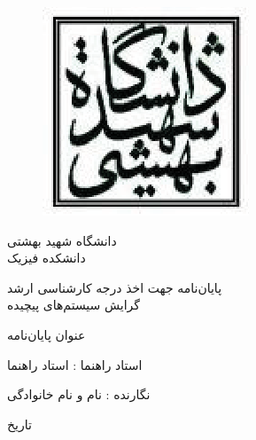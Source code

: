  \newpage
\thispagestyle{empty}
\begin{figure}[h]
\begin{center}
\includegraphics[scale = 1.5]{Logo.eps}
\end{center}
\end{figure}
\begin{center}
\LARGE{دانشگاه شهید بهشتی}\\
\LARGE{دانشکده فیزیک}\\
\end{center}
\vspace{5mm}
\begin{center}
پایان‌نامه جهت اخذ درجه کارشناسی ارشد\\
گرایش سیستم‌های پیچیده
\end{center}
\vspace{0.5cm}
\begin{center}
\Huge{عنوان پایان‌نامه}
\end{center}
\vspace{1cm}
\begin{center}
استاد راهنما : استاد راهنما
\end{center}
\vspace{1cm}
\begin{center}
نگارنده : نام و نام خانوادگی
\end{center}
\vspace{0.5cm}
\begin{center}
تاریخ
\end{center}